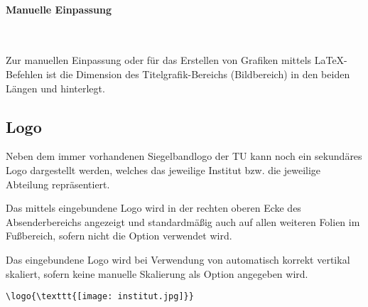 \paragraph{Manuelle Einpassung}\hfill

\begin{Declaration}
  \\
\end{Declaration}

Zur manuellen Einpassung oder für das Erstellen von Grafiken mittels
\LaTeX-Befehlen ist die Dimension des Titelgrafik-Bereichs (Bildbereich) in den
beiden Längen  und 
hinterlegt.


\subsection{Logo}

Neben dem immer vorhandenen Siegelbandlogo der TU kann noch ein sekundäres Logo
dargestellt werden, welches das jeweilige Institut bzw. die jeweilige Abteilung
repräsentiert.

\begin{Declaration}
\end{Declaration}

Das mittels  eingebundene Logo wird in der rechten oberen
Ecke des Absenderbereichs angezeigt und standardmäßig auch auf allen weiteren
Folien im Fußbereich, sofern nicht die Option 
verwendet wird.

Das eingebundene Logo wird bei Verwendung von 
automatisch korrekt vertikal skaliert,
sofern keine manuelle Skalierung als Option angegeben wird.


\begin{example}
\begin{lstlisting}
\logo{\texttt{[image: institut.jpg]}}
\end{lstlisting}
\end{example}

